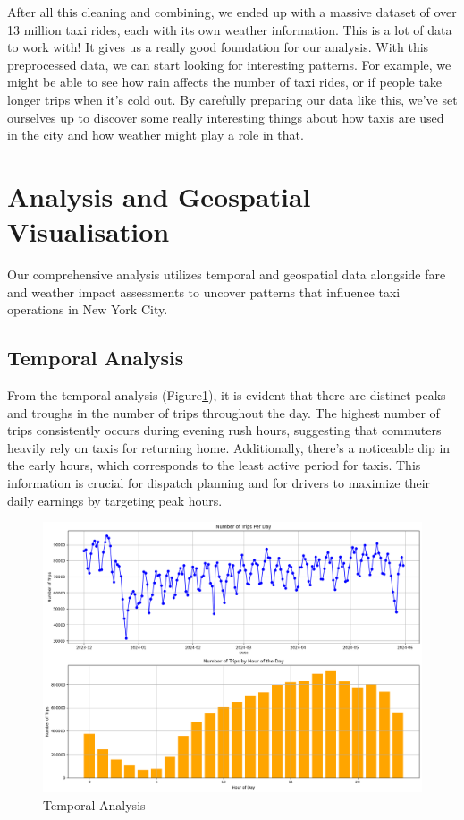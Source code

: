 \documentclass[11pt]{article}
\begin{document}
After all this cleaning and combining, we ended up with a massive dataset of over 13 million taxi rides, each with its own weather information. This is a lot of data to work with! It gives us a really good foundation for our analysis. With this preprocessed data, we can start looking for interesting patterns. For example, we might be able to see how rain affects the number of taxi rides, or if people take longer trips when it's cold out. By carefully preparing our data like this, we've set ourselves up to discover some really interesting things about how taxis are used in the city and how weather might play a role in that.




\section{Analysis and Geospatial Visualisation}
Our comprehensive analysis utilizes temporal and geospatial data alongside fare and weather impact assessments to uncover patterns that influence taxi operations in New York City.

\subsection{Temporal Analysis}
From the temporal analysis (Figure\ref{fig:1}), it is evident that there are distinct peaks and troughs in the number of trips throughout the day. The highest number of trips consistently occurs during evening rush hours, suggesting that commuters heavily rely on taxis for returning home. Additionally, there's a noticeable dip in the early hours, which corresponds to the least active period for taxis. This information is crucial for dispatch planning and for drivers to maximize their daily earnings by targeting peak hours.

\begin{figure}[h]
    \includegraphics[width=.85\textwidth]{image/Temporal Analysis.png}
    \centering
    \caption{Temporal Analysis} %
    \label{fig:1}
    
\end{figure}
\end{document}
